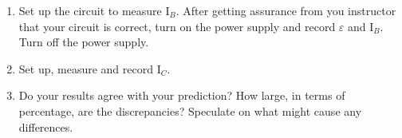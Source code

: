 \begin{enumerate}
\item Set up the circuit to measure I\( _{B} \). After getting assurance
from you instructor that your circuit is correct, turn on the power
supply and record \( \varepsilon  \) and I\( _{B} \). Turn off the
power supply.\vspace{15mm}

\item Set up, measure and record I\( _{C} \).\vspace{15mm}

\item Do your results agree with your prediction? How large, in terms of
percentage, are the discrepancies? Speculate on what might cause any
differences.\vspace{15mm}
\end{enumerate}


